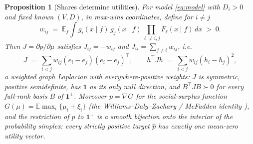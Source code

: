 \documentclass[12pt]{article}
\newtheorem{proposition}{Proposition}
\theoremstyle{remark}
\newcommand{\E}{\mathbb{E}}
\begin{document}
\begin{proposition}[Shares determine utilities]\label{thm:inv}
For model \eqref{eq:model} with $D_i > 0$ and fixed known $(V, D)$, in
max-wins coordinates, define
for $i \ne j$
\[
w_{ij} \;=\; \E_f \int g_i(x \mid f)\, g_j(x \mid f)
\prod_{\ell \ne i,j} F_\ell(x \mid f)\, dx \;>\; 0 .
\]
Then $J = \partial p / \partial \mu$ satisfies $J_{ij} = -w_{ij}$ and
$J_{ii} = \sum_{j \ne i} w_{ij}$, i.e.
\[
J \;=\; \sum_{i<j} w_{ij} (e_i - e_j)(e_i - e_j)^\top,
\qquad
h^\top J h \;=\; \sum_{i<j} w_{ij} (h_i - h_j)^2 ,
\]
a weighted graph Laplacian with everywhere-positive weights: $J$ is symmetric,
positive semidefinite, has $\mathbf{1}$ as its only null direction, and
$B^\top J B \succ 0$ for every full-rank basis $B$ of $\mathbf{1}^\perp$.
Moreover $p = \nabla G$ for the social-surplus function
$G(\mu) = \E \max_i \{\mu_i + \xi_i\}$ (the Williams--Daly--Zachary /
McFadden identity \citep{williams1977,daly1978,mcfadden1981}), and the restriction of $p$ to
$\mathbf{1}^\perp$ is a smooth bijection onto the interior of the
probability simplex: every strictly positive target $\hat p$ has exactly one
mean-zero utility vector.
\end{proposition}
\end{document}

